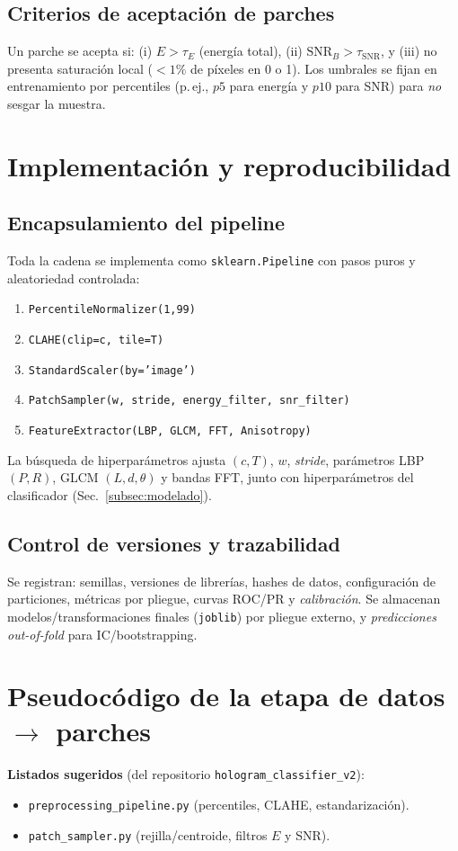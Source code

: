 \subsection{Criterios de aceptación de parches}
Un parche se acepta si: (i) $E>\tau_E$ (energía total), (ii) $\mathrm{SNR}_B>\tau_\mathrm{SNR}$, y (iii) no presenta saturación local ($<1\%$ de píxeles en 0 o 1). Los umbrales se fijan en entrenamiento por percentiles (p.\,ej., $p5$ para energía y $p10$ para SNR) para \emph{no} sesgar la muestra.

\section{Implementación y reproducibilidad}
\subsection{Encapsulamiento del pipeline}
Toda la cadena se implementa como \texttt{sklearn.Pipeline} con pasos puros y aleatoriedad controlada:
\begin{enumerate}
\item \texttt{PercentileNormalizer(1,99)}
\item \texttt{CLAHE(clip=c, tile=T)}
\item \texttt{StandardScaler(by='image')}
\item \texttt{PatchSampler(w, stride, energy\_filter, snr\_filter)}
\item \texttt{FeatureExtractor(LBP, GLCM, FFT, Anisotropy)}
\end{enumerate}
La búsqueda de hiperparámetros ajusta $(c,T)$, $w$, \emph{stride}, parámetros LBP $(P,R)$, GLCM $(L,d,\theta)$ y bandas FFT, junto con hiperparámetros del clasificador (Sec.~\ref{subsec:modelado}).

\subsection{Control de versiones y trazabilidad}
Se registran: semillas, versiones de librerías, hashes de datos, configuración de particiones, métricas por pliegue, curvas ROC/PR y \emph{calibración}. Se almacenan modelos/transformaciones finales (\texttt{joblib}) por pliegue externo, y \emph{predicciones out-of-fold} para IC/bootstrapping.

\section{Pseudocódigo de la etapa de datos $\to$ parches}
\noindent\textbf{Listados sugeridos} (del repositorio \texttt{hologram\_classifier\_v2}):
\begin{itemize}
\item \texttt{preprocessing\_pipeline.py} (percentiles, CLAHE, estandarización).
\item \texttt{patch\_sampler.py} (rejilla/centroide, filtros $E$ y SNR).
\end{itemize}

